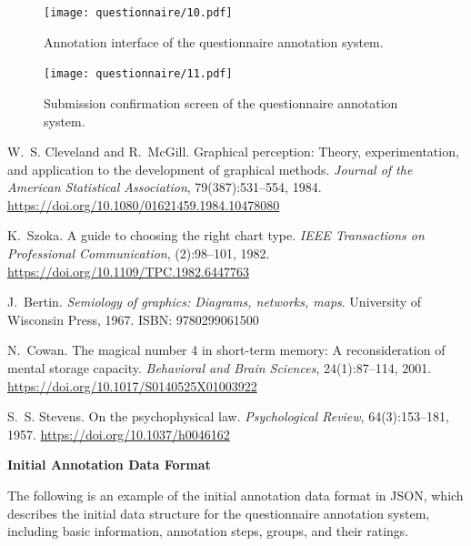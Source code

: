 \documentclass[journal]{IEEEtran}
\begin{document}
\begin{figure}[!htbp]
    \centering
    \texttt{[image: questionnaire/10.pdf]}
    \caption{Annotation interface of the questionnaire annotation system.}
    \label{fig:questionnaire_ui_c}
\end{figure}

\begin{figure}[!htbp]
  \centering
  \texttt{[image: questionnaire/11.pdf]}
  \caption{Submission confirmation screen of the questionnaire annotation system.}
  \label{fig:questionnaire_ui_d}
\end{figure}



\begin{thebibliography}{9}

W.~S. Cleveland and R.~McGill.
\newblock Graphical perception: Theory, experimentation, and application to the development of graphical methods.
\newblock \emph{Journal of the American Statistical Association}, 79(387):531--554, 1984.
\newblock \url{https://doi.org/10.1080/01621459.1984.10478080}

K.~Szoka.
\newblock A guide to choosing the right chart type.
\newblock \emph{IEEE Transactions on Professional Communication}, (2):98--101, 1982.
\newblock \url{https://doi.org/10.1109/TPC.1982.6447763}

J.~Bertin.
\newblock \emph{Semiology of graphics: Diagrams, networks, maps}.
\newblock University of Wisconsin Press, 1967.
\newblock ISBN: 9780299061500

N.~Cowan.
\newblock The magical number 4 in short-term memory: A reconsideration of mental storage capacity.
\newblock \emph{Behavioral and Brain Sciences}, 24(1):87--114, 2001.
\newblock \url{https://doi.org/10.1017/S0140525X01003922}

S.~S. Stevens.
\newblock On the psychophysical law.
\newblock \emph{Psychological Review}, 64(3):153--181, 1957.
\newblock \url{https://doi.org/10.1037/h0046162}

\end{thebibliography}


\clearpage
\textbf{Initial Annotation Data Format}

The following is an example of the initial annotation data format in JSON, which describes the initial data structure for the questionnaire annotation system, including basic information, annotation steps, groups, and their ratings.
\end{document}
